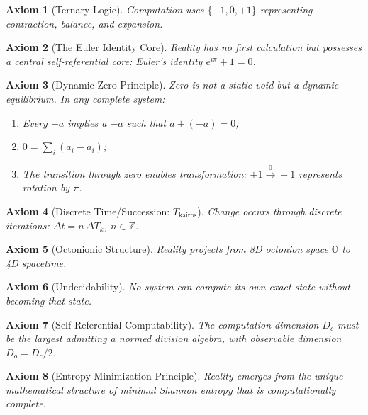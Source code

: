 \documentclass[pdflatex,sn-mathphys-num]{sn-jnl}
\theoremstyle{thmstyleone}
\theoremstyle{thmstyletwo}
\theoremstyle{thmstylethree}
\newtheorem{axiom}{Axiom}
\begin{document}
\begin{axiom}[Ternary Logic]\label{ax:ternary}
Computation uses $\{-1, 0, +1\}$ representing contraction, balance, and expansion.
\end{axiom}

\begin{axiom}[The Euler Identity Core]\label{ax:euler-core}
Reality has no first calculation but possesses a central self-referential core: Euler's identity $e^{i\pi} + 1 = 0$.
\end{axiom}

\begin{axiom}[Dynamic Zero Principle]\label{ax:dynamic-zero}
Zero is not a static void but a dynamic equilibrium. In any complete system:
\begin{enumerate}\itemsep0.2em
\item Every $+a$ implies a $-a$ such that $a + (-a) = 0$;
\item $0 = \sum_i (a_i-a_i)$;
\item The transition through zero enables transformation: $+1 \xrightarrow{0} -1$ represents rotation by $\pi$.
\end{enumerate}
\end{axiom}

\begin{axiom}[Discrete Time/Succession: $T_{\text{kairos}}$]\label{ax:tkairos}
Change occurs through discrete iterations: $\Delta t = n\,\Delta T_k$, $n \in \mathbb{Z}$.
\end{axiom}

\begin{axiom}[Octonionic Structure]\label{ax:octonionic}
Reality projects from 8D octonion space $\mathbb{O}$ to 4D spacetime.
\end{axiom}

\begin{axiom}[Undecidability]\label{ax:undecidability}
No system can compute its own exact state without becoming that state.
\end{axiom}

\begin{axiom}[Self-Referential Computability]\label{ax:selfref}
The computation dimension $D_c$ must be the largest admitting a normed division algebra, with observable dimension $D_o = D_c/2$.
\end{axiom}

\begin{axiom}[Entropy Minimization Principle]\label{ax:min_entropy}
Reality emerges from the unique mathematical structure of minimal Shannon entropy that is computationally complete.
\end{axiom}
\end{document}

